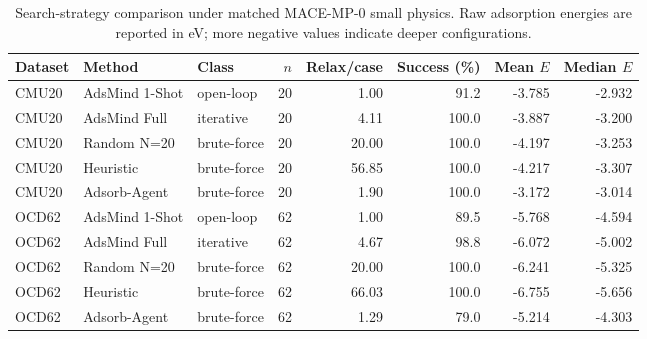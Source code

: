 \begin{table}[t]
\centering
\caption{Search-strategy comparison under matched MACE-MP-0 small physics. Raw adsorption energies are reported in eV; more negative values indicate deeper configurations.}
\label{tab:method-comparison}
\begin{tabular}{lllrrrrr}
\toprule
Dataset & Method & Class & $n$ & Relax/case & Success (\%) & Mean $E$ & Median $E$ \\
\midrule
CMU20 & AdsMind 1-Shot & open-loop & 20 & 1.00 & 91.2 & -3.785 & -2.932 \\
CMU20 & AdsMind Full & iterative & 20 & 4.11 & 100.0 & -3.887 & -3.200 \\
CMU20 & Random N=20 & brute-force & 20 & 20.00 & 100.0 & -4.197 & -3.253 \\
CMU20 & Heuristic & brute-force & 20 & 56.85 & 100.0 & -4.217 & -3.307 \\
CMU20 & Adsorb-Agent & brute-force & 20 & 1.90 & 100.0 & -3.172 & -3.014 \\
OCD62 & AdsMind 1-Shot & open-loop & 62 & 1.00 & 89.5 & -5.768 & -4.594 \\
OCD62 & AdsMind Full & iterative & 62 & 4.67 & 98.8 & -6.072 & -5.002 \\
OCD62 & Random N=20 & brute-force & 62 & 20.00 & 100.0 & -6.241 & -5.325 \\
OCD62 & Heuristic & brute-force & 62 & 66.03 & 100.0 & -6.755 & -5.656 \\
OCD62 & Adsorb-Agent & brute-force & 62 & 1.29 & 79.0 & -5.214 & -4.303 \\
\bottomrule
\end{tabular}
\end{table}
